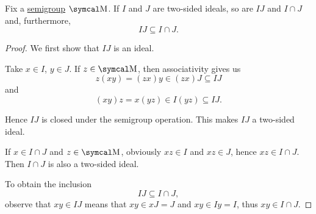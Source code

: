 \begin{proposition}\label{thm:product_of_semigroup_ideals_is_in_intersection}
  Fix a \hyperref[def:magma/associative]{semigroup} \( \CM \). If \( I \) and \( J \) are two-sided ideals, so are \( IJ \) and \( I \cap J \) and, furthermore,
  \begin{equation*}
    IJ \subseteq I \cap J.
  \end{equation*}
\end{proposition}
\begin{proof}
  We first show that \( IJ \) is an ideal.

  Take \( x \in I \), \( y \in J \). If \( z \in \CM \), then associativity gives us
  \begin{equation*}
    z(xy) = (zx)y \in (zx)J \subseteq IJ
  \end{equation*}
  and
  \begin{equation*}
    (xy)z = x(yz) \in I(yz) \subseteq IJ.
  \end{equation*}

  Hence \( IJ \) is closed under the semigroup operation. This makes \( IJ \) a two-sided ideal.

  If \( x \in I \cap J \) and \( z \in \CM \), obviously \( xz \in I \) and \( xz \in J \), hence \( xz \in I \cap J \). Then \( I \cap J \) is also a two-sided ideal.

  To obtain the inclusion
  \begin{equation*}
    IJ \subseteq I \cap J,
  \end{equation*}
  observe that \( xy \in IJ \) means that \( xy \in xJ = J \) and \( xy \in Iy = I \), thus \( xy \in I \cap J \).
\end{proof}
